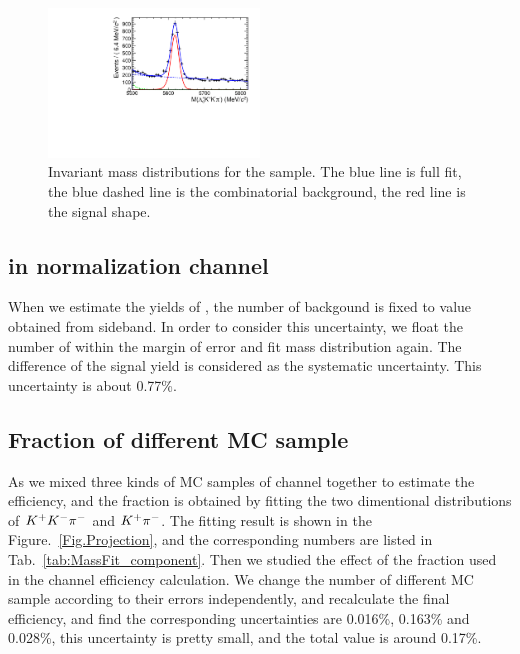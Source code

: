 \begin{figure}[hbt]
\centering
\includegraphics[width=0.5\textwidth]{Figures/05_open_charm/systematic/change_region/Lb_LcKKPi.pdf}%
\caption{Invariant mass distributions for the \LbLckkpi sample. 
The blue line is full fit, the blue dashed line is the combinatorial background, the red line is the signal shape. }
\label{fig:change_region}
\end{figure}


\subsection{ \LbLckkpi in normalization channel }
\label{sec:sys_Lckkpi_number}
When we estimate the yields of \LbLcDs, 
the number of \LbLckkpi backgound is fixed to value obtained from sideband.
In order to consider this uncertainty, 
we float the number of \LbLckkpi within the margin of error and fit mass distribution again.
The difference of the signal yield is considered as the systematic uncertainty.
This uncertainty is about 0.77\%.


\subsection{Fraction of different MC sample}
\label{sec:MC_fitting}

As we mixed three kinds of MC samples of \LbLckkpi channel together to estimate the efficiency, 
and the fraction is obtained by fitting the two dimentional distributions of ${{K}^+}{{K}^-}{{\pi}^-}$ and ${{K}^+}{{\pi}^-}$.
The fitting result is shown in the Figure.~\ref{Fig.Projection}, 
and the corresponding numbers are listed in Tab.~\ref{tab:MassFit_component}.
Then we studied the effect of the fraction used in the \LbLckkpi channel efficiency calculation.
We change the number of different MC sample according to their errors independently, 
and recalculate the final efficiency, 
and find the corresponding uncertainties are 0.016\%, 0.163\% and 0.028\%, 
this uncertainty is pretty small, 
and the total value is around 0.17\%.




